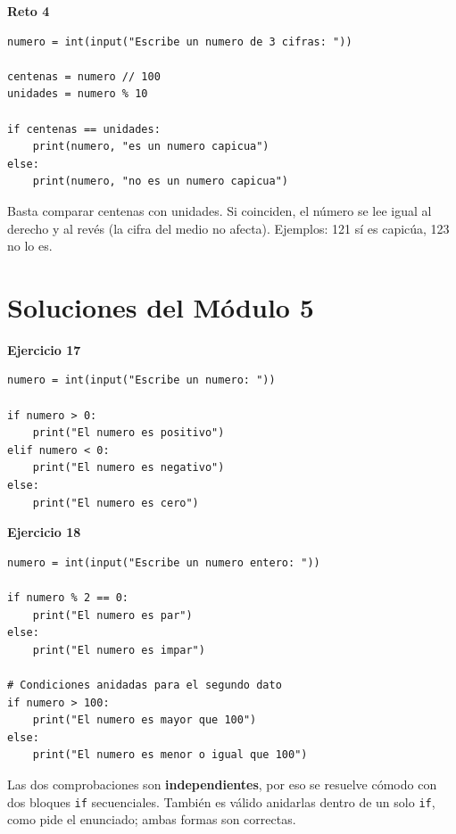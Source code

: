 \documentclass[12pt,a4paper]{article}
\begin{document}
\begin{cajaSolucion}
\textbf{Reto 4}
\begin{lstlisting}[style=pythonStyle]
numero = int(input("Escribe un numero de 3 cifras: "))

centenas = numero // 100
unidades = numero % 10

if centenas == unidades:
    print(numero, "es un numero capicua")
else:
    print(numero, "no es un numero capicua")
\end{lstlisting}

\begin{cajaNota}
Basta comparar centenas con unidades. Si coinciden, el número se lee igual al derecho y al revés (la cifra del medio no afecta). Ejemplos: 121 sí es capicúa, 123 no lo es.
\end{cajaNota}
\end{cajaSolucion}

\section{Soluciones del Módulo 5}

\begin{cajaSolucion}
\textbf{Ejercicio 17}
\begin{lstlisting}[style=pythonStyle]
numero = int(input("Escribe un numero: "))

if numero > 0:
    print("El numero es positivo")
elif numero < 0:
    print("El numero es negativo")
else:
    print("El numero es cero")
\end{lstlisting}
\end{cajaSolucion}

\begin{cajaSolucion}
\textbf{Ejercicio 18}
\begin{lstlisting}[style=pythonStyle]
numero = int(input("Escribe un numero entero: "))

if numero % 2 == 0:
    print("El numero es par")
else:
    print("El numero es impar")

# Condiciones anidadas para el segundo dato
if numero > 100:
    print("El numero es mayor que 100")
else:
    print("El numero es menor o igual que 100")
\end{lstlisting}

\begin{cajaNota}
Las dos comprobaciones son \textbf{independientes}, por eso se resuelve cómodo con dos bloques \texttt{if} secuenciales. También es válido anidarlas dentro de un solo \texttt{if}, como pide el enunciado; ambas formas son correctas.
\end{cajaNota}
\end{cajaSolucion}
\end{document}
